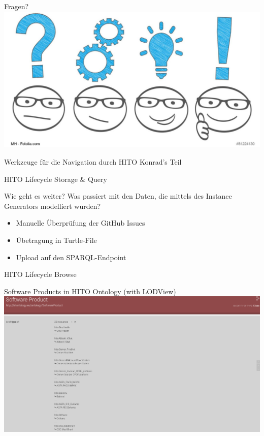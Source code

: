 \documentclass[aspectratio=1610,12pt]{beamer}
\begin{document}
\begin{frame}{Fragen?}
  \centering
  \vspace{-0.5cm}
  \includegraphics[width=\textwidth]{img/fragen.png}
\end{frame}

\begin{frame}{Werkzeuge für die Navigation durch HITO}
  \centering
  \huge Konrad's Teil
\end{frame}

\begin{frame}{HITO Lifecycle Storage \& Query}
 \centering
  \vspace{-0.5cm}
\end{frame}

\begin{frame}{Wie geht es weiter?}
  Was passiert mit den Daten, die mittels des Instance Generators modelliert wurden?
  \begin{itemize}
    \item Manuelle Überprüfung der GitHub Issues
    \item Übetragung in Turtle-File
    \item Upload auf den SPARQL-Endpoint
  \end{itemize}
\end{frame}

\begin{frame}{HITO Lifecycle Browse}
  \centering
  \vspace{-0.5cm}
\end{frame}

\begin{frame}{Software Products in HITO Ontology (with LODView)}
\centering
\includegraphics[width=\textwidth]{img/softwareproduct.png}
\end{frame}
\end{document}
